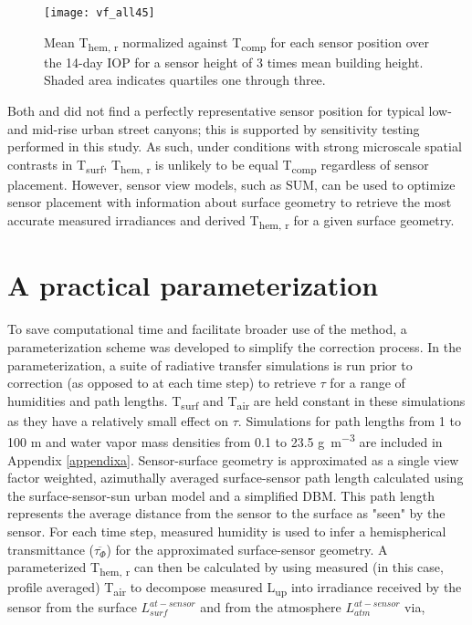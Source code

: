 \begin{bibunit}
  \begin{figure}[H]
	\centering
	\texttt{[image: vf\_all45]}
	\caption{Mean T\textsubscript{hem, r} normalized against T\textsubscript{comp} for each sensor position over the 14-day IOP for a sensor height of 3 times mean building height. Shaded area indicates quartiles one through three.}
	\label{vf_all45}
\end{figure}
 
Both \citet{Roberts2010} and \citet{Adderley2015} did not find a perfectly representative sensor position for typical low- and mid-rise urban street canyons; this is supported by sensitivity testing performed in this study. As such, under conditions with strong microscale spatial contrasts in T\textsubscript{surf}, T\textsubscript{hem, r} is unlikely to be equal T\textsubscript{comp} regardless of sensor placement. However, sensor view models, such as SUM, can be used to optimize sensor placement with information about surface geometry to retrieve the most accurate measured irradiances and derived T\textsubscript{hem, r} for a given surface geometry.

\section{A practical parameterization}

To save computational time and facilitate broader use of the method, a parameterization scheme was developed to simplify the correction process. In the parameterization, a suite of radiative transfer simulations is run prior to correction (as opposed to at each time step) to retrieve $\tau$ for a range of humidities and path lengths. T\textsubscript{surf} and T\textsubscript{air} are held constant in these simulations as they have a relatively small effect on $\tau$. Simulations for path lengths from 1 to 100 \si{\meter} and water vapor mass densities from 0.1 to 23.5 \si{\gram\per\meter\cubed} are included in Appendix \ref{appendixa}. Sensor-surface geometry is approximated as a single view factor weighted, azimuthally averaged surface-sensor path length calculated using the surface-sensor-sun urban model \citep{Soux2004} and a simplified DBM. This path length represents the average distance from the sensor to the surface as "seen" by the sensor. For each time step, measured humidity is used to infer a hemispherical transmittance ($\overline{\tau_{\Phi}}$) for the approximated surface-sensor geometry. A parameterized T\textsubscript{hem, r} can then be calculated by using measured (in this case, profile averaged) T\textsubscript{air} to decompose measured L\textsubscript{up} into irradiance received by the sensor from the surface $L_{surf}^{at-sensor}$ and from the atmosphere $L_{atm}^{at-sensor}$ via, 


\end{bibunit}
